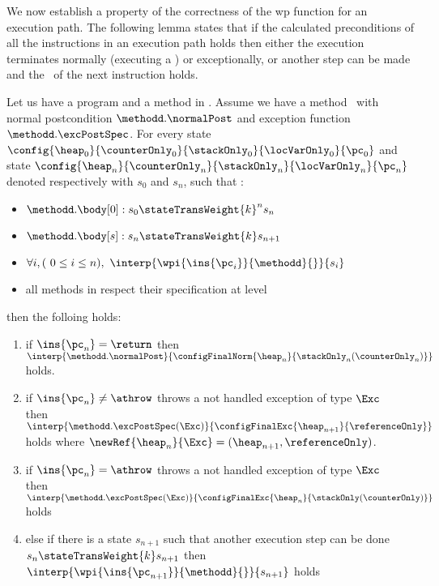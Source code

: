 We now establish a property of the correctness of the wp function  for an execution path. The following lemma states that if the calculated preconditions
of all the instructions in an execution path holds then either the execution terminates normally (executing a \return) or exceptionally, or 
another step can be made and the \fwpi \ of the next instruction holds.



\begin{lemma} \label{lemma1}
Let us have a program \Program{} and a method \methodd{} in \Program.
Assume we have a method \methodd \ with normal postcondition  $\methodd.\normalPost$ and exception function $\methodd.\excPostSpec$. 
For every state  
 $ \config{\heap_{0}}{\counterOnly_{0}}{\stackOnly_{0}}{\locVarOnly_{0}}{\pc_{0}}$ 
and state $\config{\heap_n}{\counterOnly_n}{\stackOnly_n}{\locVarOnly_n}{\pc_n} $ denoted respectively with $s_0$ and  $s_n$,
such that :
 \begin{itemize}
         \item $ \methodd.\body[0] : s_{0} \stateTransWeight{k}^{n} s_n$
         \item $ \methodd.\body[s] : s_n \stateTransWeight{k} s_{n+1}$
         \item $ \forall i, (\ 0 \leq i \leq n ) , \ \interp{\wpi{\ins{\pc_{i}} }{ \methodd } {  }}{ s_i } $  
	 \item all methods in \Program{} respect their specification at level   
	 
 \end{itemize}

then the folloing holds:
\begin{enumerate}
	\item if $\ins{\pc_n} = \return$  then $\interp{\methodd.\normalPost} {\configFinalNorm{\heap_n}{\stackOnly_n( \counterOnly_n )}} $ holds.  
	
	\item if $\ins{\pc_n}\neq \athrow  $ throws a not handled exception of type $\Exc$ \\ then
	$\interp{\methodd.\excPostSpec( \Exc)}{\configFinalExc{ \heap_{n+1}}{  \referenceOnly   } } $ holds 
	where $\newRef{\heap_n}{\Exc} = (\heap_{n+1}, \referenceOnly )$.
	
	 \item if $\ins{\pc_n} = \athrow $ throws a not handled exception of type $\Exc$ \\
	 then $\interp{\methodd.\excPostSpec( \Exc)}{\configFinalExc{ \heap_{n}}{  \stackOnly (\counterOnly)   } } $ holds 
	
	
	\item else if there is a state $s_{n+1}$ such that another execution step can be done 
	 $s_n  \stateTransWeight{k} s_{n+1}$ then  $\interp{ \wpi{\ins{\pc_{n+1}}}{\methodd}{  } } { s_{n+1} } $  holds
\end{enumerate}
\end{lemma}

